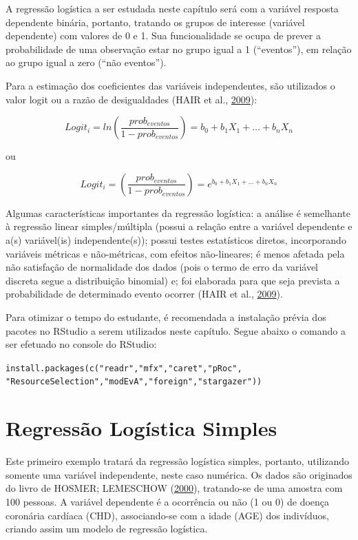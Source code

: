 \documentclass[12pt,brazil,oneside]{book}
\begin{document}
A regressão logística a ser estudada neste capítulo será com a variável
resposta dependente binária, portanto, tratando os grupos de interesse
(variável dependente) com valores de 0 e 1. Sua funcionalidade se ocupa
de prever a probabilidade de uma observação estar no grupo igual a 1
(``eventos''), em relação ao grupo igual a zero (``não eventos'').

Para a estimação dos coeficientes das variáveis independentes, são
utilizados o valor logit ou a razão de desigualdades (HAIR et al.,
\protect\hyperlink{ref-Hair2009}{2009}):

\[
Logit_i=ln\left (\frac{prob_{eventos}}{1-prob_{eventos}}  \right )=b_0+b_1X_1+\ldots+b_nX_n
\]

ou

\[
Logit_i=\left (\frac{prob_{eventos}}{1-prob_{eventos}}  \right )=e^{b_0+b_1X_1+\ldots+b_nX_n}
\]

Algumas características importantes da regressão logística: a análise é
semelhante à regressão linear simples/múltipla (possui a relação entre a
variável dependente e a(s) variável(is) independente(s)); possui testes
estatísticos diretos, incorporando variáveis métricas e não-métricas,
com efeitos não-lineares; é menos afetada pela não satisfação de
normalidade dos dados (pois o termo de erro da variável discreta segue a
distribuição binomial) e; foi elaborada para que seja prevista a
probabilidade de determinado evento ocorrer (HAIR et al.,
\protect\hyperlink{ref-Hair2009}{2009}).

Para otimizar o tempo do estudante, é recomendada a instalação prévia
dos pacotes no RStudio a serem utilizados neste capítulo. Segue abaixo o
comando a ser efetuado no console do RStudio:

\texttt{install.packages(c("readr","mfx","caret","pRoc",}
\texttt{"ResourceSelection","modEvA","foreign","stargazer"))}

\hypertarget{regressao-logistica-simples}{%
\section{Regressão Logística
Simples}\label{regressao-logistica-simples}}

Este primeiro exemplo tratará da regressão logística simples, portanto,
utilizando somente uma variável independente, neste caso numérica. Os
dados são originados do livro de HOSMER; LEMESCHOW
(\protect\hyperlink{ref-Hosmer2000}{2000}), tratando-se de uma amostra
com 100 pessoas. A variável dependente é a ocorrência ou não (1 ou 0) de
doença coronária cardíaca (CHD), associando-se com a idade (AGE) dos
indivíduos, criando assim um modelo de regressão logística.
\end{document}
